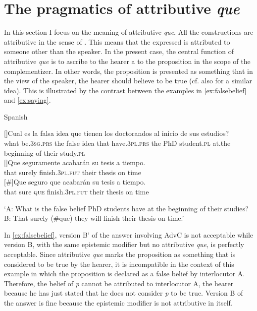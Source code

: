 \section{The pragmatics of attributive \emph{que}}\label{sec:presupprag}



In this section I focus on the meaning of attributive \emph{que}. All the constructions are attributive in the sense of \citet{Poschmann2008}. This means that the  expressed is attributed to someone  other than  the speaker. In the present case,  the  central function of attributive \emph{que} is to ascribe to the hearer a  to the proposition in the scope of the complementizer. In other words, the proposition is presented as something that in the view of the speaker, the hearer should believe to be true (cf. also \citealt{Gras2016} for a similar idea).  This is illustrated by the contrast between the examples in \eqref{ex:falsebelief} and \eqref{ex:saying}.

\ea\label{ex:falsebelief}Spanish \judgewidth{\#}
\begin{xlist}
[]{\gll Cual es la falsa idea que tienen los doctorandos al inicio de sus estudios?\\
what be.\textsc{3sg.prs} the false idea that have.\textsc{3pl.prs} the {PhD student.\textsc{pl}} at.the beginning of their study.\textsc{pl}\\}
[]{\gll  Que seguramente acabarán su tesis a tiempo.\\
 that surely finish.\textsc{3pl.fut} their thesis on time\\}
[\#]{\gll Que seguro que acabarán su tesis a tiempo.\\
				   that sure \textsc{que} finish.\textsc{3pl.fut} their thesis on time\\}
\end{xlist}
\glt `A: What is the false belief PhD students have at the beginning of their studies? B: That surely (\#que) they will  finish their thesis on time.'
\z

In \eqref{ex:falsebelief},  version B' of the answer involving AdvC is not acceptable while  version B, with the same epistemic modifier but no attributive \emph{que}, is perfectly acceptable.  Since  attributive \emph{que} marks the proposition as something that is considered to be true by the hearer, it is incompatible  in the context of this example in which the proposition is declared as a false belief by interlocutor A. Therefore, the belief of \emph{p}  cannot be attributed to interlocutor A, the hearer because he has just stated that he does not consider \emph{p}  to be true.  Version B of the answer is fine because the epistemic modifier  is not attributive in itself.

